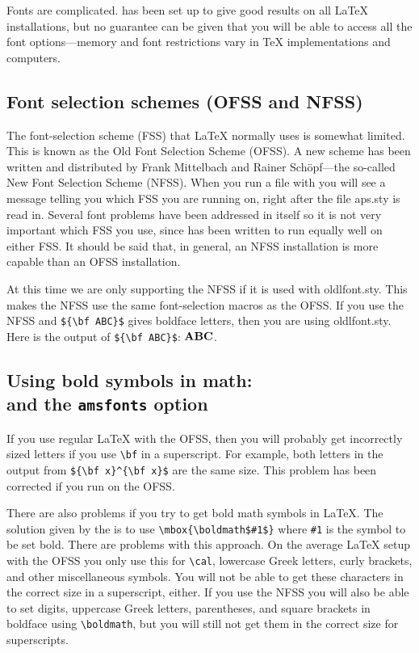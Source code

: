 Fonts are complicated. \REVTeX{} has been set up to give good results on
all \LaTeX{} installations, but no guarantee can be given that you will be
able to access all the font options---memory and font restrictions vary in
\TeX{} implementations and computers.

\subsection{Font selection schemes (OFSS and NFSS)}
\label{sec:onfss}

The font-selection scheme (FSS) that \LaTeX{} normally uses is somewhat
limited. This is known as the Old Font Selection Scheme (OFSS). A new
scheme has been written and distributed by Frank Mittelbach and Rainer
Sch\"opf---the so-called New Font Selection Scheme (NFSS). When you run a
file with \REVTeX{} you will see a message telling you which FSS you are
running on, right after the file aps.sty is read in. Several font problems
have been addressed in \REVTeX{} itself so it is not very important which
FSS you use, since \REVTeX{} has been written to run equally well on either
FSS. It should be said that, in general, an NFSS installation is more
capable than an OFSS installation.

At this time we are only supporting the NFSS if it is used with
oldlfont.sty. This makes the NFSS use the same font-selection macros as the
OFSS. If you use the NFSS and \verb+${\bf ABC}$+ gives boldface letters,
then you are using oldlfont.sty. Here is the output of \verb+${\bf ABC}$+:
${\bf ABC}$.

\subsection[Using bold symbols in math:
\btt{bbox$\{\#1\}$} and the {\protect\tt amsfonts} option]%
{Using bold symbols in math:\protect\\
 and the {\protect\tt amsfonts} option}
\label{sec:bboxamsfonts}

If you use regular \LaTeX{} with the OFSS, then you will probably get
incorrectly sized letters if you use \verb+\bf+ in a superscript. For
example, both letters in the output from \verb+${\bf x}^{\bf x}$+ are the
same size. This problem has been corrected if you run \REVTeX{} on the
OFSS.

There are also problems if you try to get bold math symbols in \LaTeX{}.
The solution given by the \LUG{} is to use \verb+\mbox{\boldmath$#1$}+
where \verb+#1+ is the symbol to be set bold. There are problems with this
approach. On the average \LaTeX{} setup with the OFSS you only use this for
\verb+\cal+, lowercase Greek letters, curly brackets, and other
miscellaneous symbols. You will not be able to get these characters in the
correct size in a superscript, either. If you use the NFSS you will also be
able to set digits, uppercase Greek letters, parentheses, and square
brackets in boldface using \verb+\boldmath+, but you will still not get
them in the correct size for superscripts.

